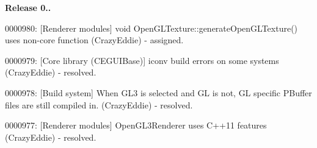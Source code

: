 {\bfseries{Release 0..}}
\begin{DoxyItemize}
\item 0000980\+: \mbox{[}Renderer modules\mbox{]} void Open\+G\+L\+Texture\+::generate\+Open\+G\+L\+Texture() uses non-\/core function (Crazy\+Eddie) -\/ assigned.
\item 0000979\+: \mbox{[}Core library (C\+E\+G\+U\+I\+Base)\mbox{]} iconv build errors on some systems (Crazy\+Eddie) -\/ resolved.
\item 0000978\+: \mbox{[}Build system\mbox{]} When G\+L3 is selected and GL is not, GL specific P\+Buffer files are still compiled in. (Crazy\+Eddie) -\/ resolved.
\item 0000977\+: \mbox{[}Renderer modules\mbox{]} Open\+G\+L3\+Renderer uses C++11 features (Crazy\+Eddie) -\/ resolved.
\end{DoxyItemize}

